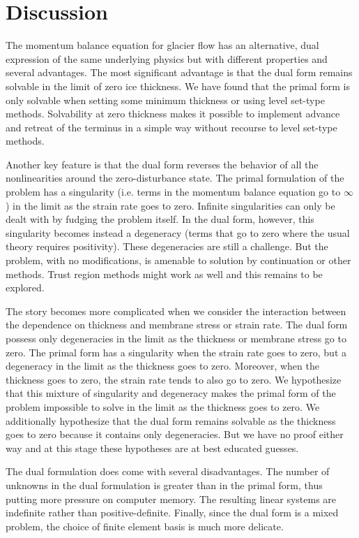 \documentclass[twocolumn,letterpaper]{igs}
\begin{document}
\section{Discussion}

The momentum balance equation for glacier flow has an alternative, dual expression of the same underlying physics but with different properties and several advantages.
The most significant advantage is that the dual form remains solvable in the limit of zero ice thickness.
We have found that the primal form is only solvable when setting some minimum thickness or using level set-type methods.
Solvability at zero thickness makes it possible to implement advance and retreat of the terminus in a simple way without recourse to level set-type methods.

Another key feature is that the dual form reverses the behavior of all the nonlinearities around the zero-disturbance state.
The primal formulation of the problem has a singularity (i.e. terms in the momentum balance equation go to $\infty$) in the limit as the strain rate goes to zero.
Infinite singularities can only be dealt with by fudging the problem itself.
In the dual form, however, this singularity becomes instead a degeneracy (terms that go to zero where the usual theory requires positivity).
These degeneracies are still a challenge.
But the problem, with no modifications, is amenable to solution by continuation or other methods.
Trust region methods might work as well and this remains to be explored.

The story becomes more complicated when we consider the interaction between the dependence on thickness and membrane stress or strain rate.
The dual form possess only degeneracies in the limit as the thickness or membrane stress go to zero.
The primal form has a singularity when the strain rate goes to zero, but a degeneracy in the limit as the thickness goes to zero.
Moreover, when the thickness goes to zero, the strain rate tends to also go to zero.
We hypothesize that this mixture of singularity and degeneracy makes the primal form of the problem impossible to solve in the limit as the thickness goes to zero.
We additionally hypothesize that the dual form remains solvable as the thickness goes to zero because it contains only degeneracies.
But we have no proof either way and at this stage these hypotheses are at best educated guesses.

The dual formulation does come with several disadvantages.
The number of unknowns in the dual formulation is greater than in the primal form, thus putting more pressure on computer memory.
The resulting linear systems are indefinite rather than positive-definite.
Finally, since the dual form is a mixed problem, the choice of finite element basis is much more delicate.
\end{document}
